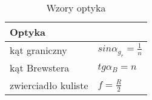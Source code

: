 \begin{table}[!h]
\def\arraystretch{2}
\centering
\begin{tabular}{|ll|}
\hline
\multicolumn{2}{|l|}{Optyka}  \\ \hline
\multicolumn{1}{|l|}{kąt graniczny} & $sin \alpha_g_r=\frac{1}{n}$  \\ \hline
\multicolumn{1}{|l|}{kąt Brewstera} & $tg \alpha_B=n$ \\ \hline
\multicolumn{1}{|l|}{zwierciadło kuliste} & $f=\frac{R}{2}$ \\ \hline
\end{tabular}
\caption{Wzory optyka}
\label{optyka}
\end{table}